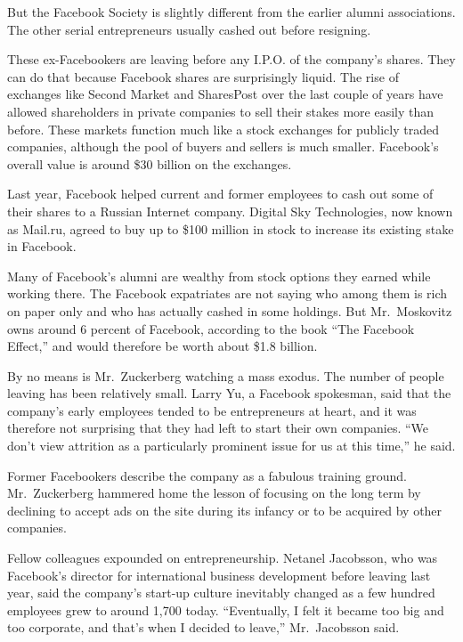 ﻿\documentclass[12pt]{article}
\begin{document}
But the Facebook Society is slightly different from the earlier alumni associations. The other
serial entrepreneurs usually cashed out before resigning.

These ex-Facebookers are leaving before any I.P.O. of the company's shares. They can do that because
Facebook shares are surprisingly liquid. The rise of exchanges like Second Market and SharesPost
over the last couple of years have allowed shareholders in private companies to sell their stakes
more easily than before. These markets function much like a stock exchanges for publicly traded
companies, although the pool of buyers and sellers is much smaller. Facebook's overall value is
around \$30 billion on the exchanges.

Last year, Facebook helped current and former employees to cash out some of their shares to a
Russian Internet company. Digital Sky Technologies, now known as Mail.ru, agreed to buy up to \$100
million in stock to increase its existing stake in Facebook.

Many of Facebook's alumni are wealthy from stock options they earned while working there. The
Facebook expatriates are not saying who among them is rich on paper only and who has actually cashed
in some holdings. But Mr.~Moskovitz owns around 6 percent of Facebook, according to the book ``The
Facebook Effect,'' and would therefore be worth about \$1.8 billion.

By no means is Mr.~Zuckerberg watching a mass exodus. The number of people leaving has been
relatively small. Larry Yu, a Facebook spokesman, said that the company's early employees tended to
be entrepreneurs at heart, and it was therefore not surprising that they had left to start their own
companies. ``We don't view attrition as a particularly prominent issue for us at this time,'' he
said.

Former Facebookers describe the company as a fabulous training ground. Mr.~Zuckerberg hammered home
the lesson of focusing on the long term by declining to accept ads on the site during its infancy or
to be acquired by other companies.

Fellow colleagues expounded on entrepreneurship. Netanel Jacobsson, who was Facebook's director for
international business development before leaving last year, said the company's start-up culture
inevitably changed as a few hundred employees grew to around 1,700 today. ``Eventually, I felt it
became too big and too corporate, and that's when I decided to leave,'' Mr.~Jacobsson said.
\end{document}
